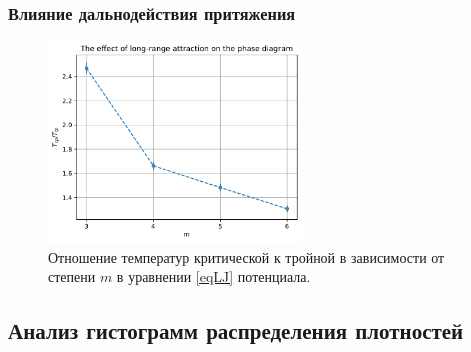 \documentclass[pdf,hyperref={unicode}]{beamer}
\begin{document}
\begin{frame}
\transdissolve[duration=0.2]
\frametitle{Влияние дальнодействия притяжения}

\begin{figure}[h]
\begin{center}
\includegraphics[width=0.6\textwidth]{effect of long-range attraction}
\caption{Отношение температур критической к тройной в зависимости от степени $m$ в уравнении \ref{eqLJ} потенциала.}
\label{risTcpTtp}
\end{center}
\end{figure}

\end{frame}



\subsection{Анализ гистограмм распределения плотностей}
\end{document}
